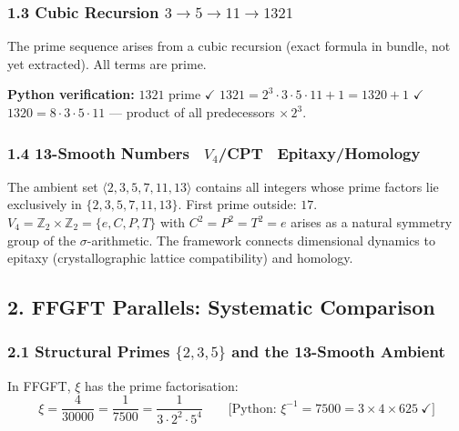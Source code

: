 \subsubsection*{1.3 Cubic Recursion $3 \to 5 \to 11 \to 1321$}

The prime sequence arises from a cubic recursion
(exact formula in bundle, not yet extracted). All terms are prime.

\begin{mdframed}[style=ok]
\textbf{Python verification:} $1321$ prime $\checkmark$ \quad
$1321 = 2^3 \cdot 3 \cdot 5 \cdot 11 + 1 = 1320 + 1$ $\checkmark$\\
$1320 = 8 \cdot 3 \cdot 5 \cdot 11$ — product of all predecessors $\times\, 2^3$.
\end{mdframed}

\subsubsection*{1.4 13-Smooth Numbers \textperiodcentered\ $V_4$/CPT \textperiodcentered\ Epitaxy/Homology}

The ambient set $\langle 2,3,5,7,11,13 \rangle$ contains all integers whose
prime factors lie exclusively in $\{2,3,5,7,11,13\}$.
First prime outside: $17$.
$V_4 = \mathbb{Z}_2 \times \mathbb{Z}_2 = \{e,C,P,T\}$ with $C^2=P^2=T^2=e$
arises as a natural symmetry group of the $\sigma$-arithmetic.
The framework connects dimensional dynamics to epitaxy
(crystallographic lattice compatibility) and homology.

\subsection*{2. FFGFT Parallels: Systematic Comparison}

\subsubsection*{2.1 Structural Primes $\{2, 3, 5\}$ and the 13-Smooth Ambient}

In FFGFT, $\xi$ has the prime factorisation:
\[
\xi = \frac{4}{30000} = \frac{1}{7500} = \frac{1}{3 \cdot 2^2 \cdot 5^4}
\qquad \text{[Python: } \xi^{-1} = 7500 = 3 \times 4 \times 625\ \checkmark\text{]}
\]

\begin{center}
\end{center}

